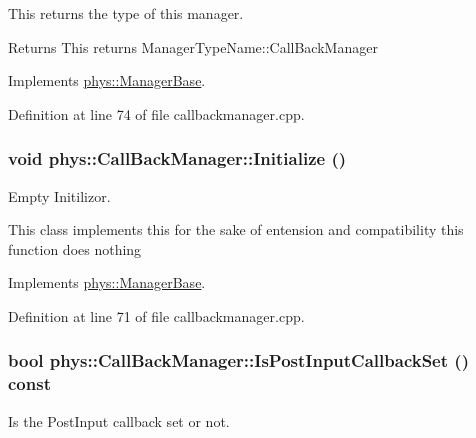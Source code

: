 This returns the type of this manager. 

\begin{DoxyReturn}{Returns}
This returns ManagerTypeName::CallBackManager 
\end{DoxyReturn}


Implements \hyperlink{classphys_1_1ManagerBase_aff400b6599db635e24796d8221e9a0e3}{phys::ManagerBase}.



Definition at line 74 of file callbackmanager.cpp.

\hypertarget{classphys_1_1CallBackManager_a3d2af4e3c947b14f628c3e09a96af2f9}{
\subsubsection[{Initialize}]{\setlength{\rightskip}{0pt plus 5cm}void phys::CallBackManager::Initialize ()}}
\label{d1/d47/classphys_1_1CallBackManager_a3d2af4e3c947b14f628c3e09a96af2f9}


Empty Initilizor. 

This class implements this for the sake of entension and compatibility this function does nothing 

Implements \hyperlink{classphys_1_1ManagerBase_a57dd8e54e767427d5bdcc86dc66d73ed}{phys::ManagerBase}.



Definition at line 71 of file callbackmanager.cpp.

\hypertarget{classphys_1_1CallBackManager_afa96dbc0779e5fa386546502b3db6c39}{
\subsubsection[{IsPostInputCallbackSet}]{\setlength{\rightskip}{0pt plus 5cm}bool phys::CallBackManager::IsPostInputCallbackSet () const}}
\label{d1/d47/classphys_1_1CallBackManager_afa96dbc0779e5fa386546502b3db6c39}


Is the PostInput callback set or not. 

